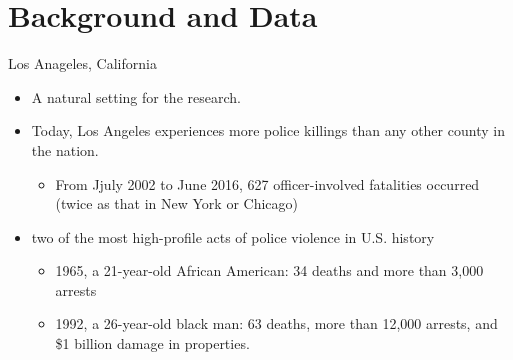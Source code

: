 \documentclass[dvipdfmx]{beamer}
\begin{document}
\section{Background and Data}
\frame{\sectionpage}

\begin{frame}{Los Anageles, California}
  \begin{itemize}
    \item A natural setting for the research.
    \item Today, Los Angeles experiences more police killings than any other county in the nation.
    \begin{itemize}
      \item From Jjuly 2002 to June 2016, 627 officer-involved fatalities occurred (twice as that in New York or Chicago)
    \end{itemize}
    \item two of the most high-profile acts of police violence in U.S. history
    \begin{itemize}
      \item 1965, a 21-year-old African American: 34 deaths and more than 3,000 arrests 
      \item 1992, a 26-year-old black man:  63 deaths, more than 12,000 arrests, and \$1 billion damage in properties.
    \end{itemize}
  \end{itemize}
\end{frame}
\end{document}
